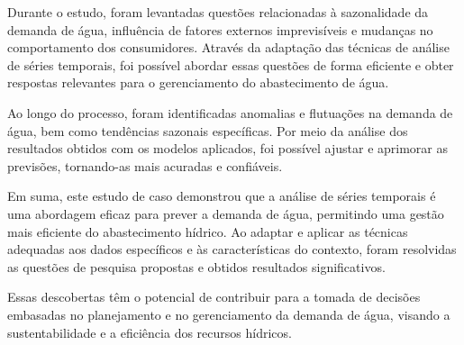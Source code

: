 Durante o estudo, foram levantadas questões relacionadas à sazonalidade da demanda de água, influência de fatores externos imprevisíveis e mudanças no comportamento dos consumidores. Através da adaptação das técnicas de análise de séries temporais, foi possível abordar essas questões de forma eficiente e obter respostas relevantes para o gerenciamento do abastecimento de água.

Ao longo do processo, foram identificadas anomalias e flutuações na demanda de água, bem como tendências sazonais específicas. Por meio da análise dos resultados obtidos com os modelos aplicados, foi possível ajustar e aprimorar as previsões, tornando-as mais acuradas e confiáveis.

Em suma, este estudo de caso demonstrou que a análise de séries temporais é uma abordagem eficaz para prever a demanda de água, permitindo uma gestão mais eficiente do abastecimento hídrico. Ao adaptar e aplicar as técnicas adequadas aos dados específicos e às características do contexto, foram resolvidas as questões de pesquisa propostas e obtidos resultados significativos.

Essas descobertas têm o potencial de contribuir para a tomada de decisões embasadas no planejamento e no gerenciamento da demanda de água, visando a sustentabilidade e a eficiência dos recursos hídricos.

